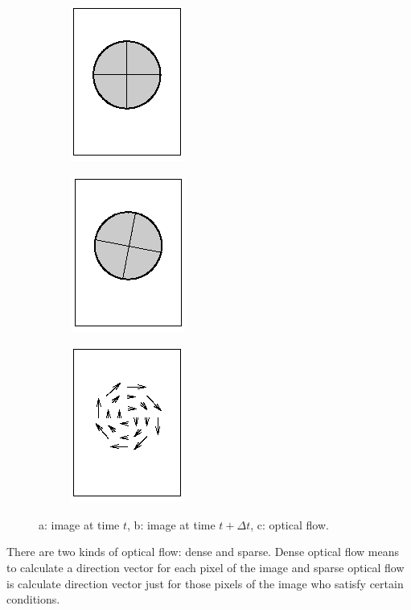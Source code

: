 \begin{figure}[h!]
\begin{center}
\begin{subfigure}[b]{0.22\textwidth}
\includegraphics[scale=0.6]{images/oflow1}
\caption{}
\end{subfigure}
\begin{subfigure}[b]{0.22\textwidth}
\includegraphics[scale=0.6]{images/oflow2}
\caption{}
\end{subfigure}
\begin{subfigure}[b]{0.22\textwidth}
\includegraphics[scale=0.6]{images/oflow3}
\caption{}
\end{subfigure}
\caption{a: image at time $t$, b: image at time $t + \Delta t$, c: optical flow.}
\label{fig:oflow}
\end{center}
\end{figure}

There are two kinds of optical flow: dense and sparse. Dense optical flow means to calculate a direction vector for each pixel of the image and sparse optical flow is calculate direction vector just for those pixels of the image 
who satisfy certain conditions.

